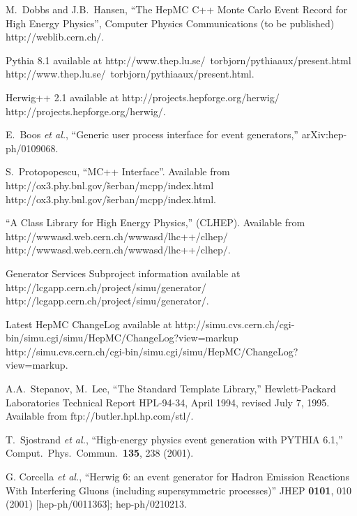 \documentclass[11pt,letterpaper]{article}
\begin{document}
\begin{thebibliography}{99}

  M.~Dobbs and J.B.~Hansen, ``The HepMC C++ Monte Carlo Event Record for
  High Energy Physics'', Computer Physics Communications (to be
  published) 
  {http://weblib.cern.ch/}.  

  Pythia 8.1 available at \htmladdnormallink
  {http://www.thep.lu.se/~torbjorn/pythiaaux/present.html}
  {http://www.thep.lu.se/~torbjorn/pythiaaux/present.html}.

  Herwig++ 2.1 available at \htmladdnormallink
  {http://projects.hepforge.org/herwig/}
  {http://projects.hepforge.org/herwig/}.

E.~Boos {\it et al.},
``Generic user process interface for event generators,''
arXiv:hep-ph/0109068.

  S.~Protopopescu, ``MC++ Interface''.
  Available from \htmladdnormallink
  {http://ox3.phy.bnl.gov/\~serban/mcpp/index.html}
  {http://ox3.phy.bnl.gov/\~serban/mcpp/index.html}.

  ``A Class Library for High Energy Physics,'' (CLHEP).
  Available from 
  \htmladdnormallink
  {http://wwwasd.web.cern.ch/wwwasd/lhc++/clhep/}
  {http://wwwasd.web.cern.ch/wwwasd/lhc++/clhep/}.

   Generator Services Subproject information available at 
   \htmladdnormallink
  {http://lcgapp.cern.ch/project/simu/generator/}
  {http://lcgapp.cern.ch/project/simu/generator/}.

  Latest HepMC ChangeLog available at  \htmladdnormallink
  {http://simu.cvs.cern.ch/cgi-bin/simu.cgi/simu/HepMC/ChangeLog?view=markup}
  {http://simu.cvs.cern.ch/cgi-bin/simu.cgi/simu/HepMC/ChangeLog?view=markup}.

  A.A.~Stepanov, M.~Lee, ``The Standard Template Library,''
  Hewlett-Packard Laboratories Technical Report HPL-94-34, April 1994,
  revised July 7, 1995.
  Available from 
  {ftp://butler.hpl.hp.com/stl/}.

  T.~Sjostrand {\it et al.}, 
  ``High-energy physics event generation with PYTHIA 6.1,''
  Comput.\ Phys.\ Commun.\  {\bf 135}, 238 (2001).

   G. Corcella {\it et al.}, 
  ``Herwig 6: an event generator for Hadron Emission Reactions
  With Interfering Gluons (including supersymmetric processes)''
  JHEP {\bf 0101}, 010 (2001) [hep-ph/0011363]; hep-ph/0210213.


\end{thebibliography}
\end{document}
